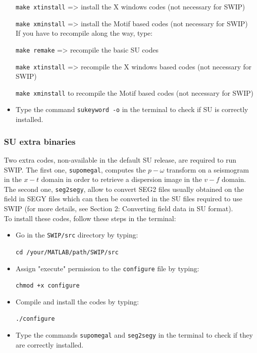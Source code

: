 \documentclass[twoside,a4paper]{article}
\begin{document}
\begin{itemize}
\verb|make xtinstall| => install the X windows codes (not necessary for SWIP)

\verb|make xminstall| => install the Motif based codes (not necessary for SWIP)\\[1ex]
If you have to recompile along the way, type:

\verb|make remake| => recompile the basic SU codes

\verb|make xtinstall| => recompile the X windows based codes (not necessary for SWIP)

\verb|make xminstall| to recompile the Motif based codes (not necessary for SWIP)

\item Type the command \verb|sukeyword -o| in the terminal to check if SU is correctly installed.
\end{itemize}

\subsubsection{SU extra binaries}
Two extra codes, non-available in the default SU release, are required to run SWIP. The first one, \verb|supomegal|, computes the $p-\omega$ transform on a seismogram in the $x-t$ domain in order to retrieve a dispersion image in the $v-f$ domain. The second one, \verb|seg2segy|, allow to convert SEG2 files usually obtained on the field in SEGY files which can then be converted in the SU files required to use SWIP (for more details, see Section 2: Converting field data in SU format).\\[1ex]
To install these codes, follow these steps in the terminal:
\begin{itemize}
\setlength\itemsep{2ex}
\setlength{\parindent}{5ex}
\item Go in the \verb|SWIP/src| directory by typing:

\verb|cd /your/MATLAB/path/SWIP/src|

\item Assign "execute" permission to the \verb|configure| file by typing:

\verb|chmod +x configure|

\item Compile and install the codes by typing:

\verb|./configure|

\item Type the commands \verb|supomegal| and \verb|seg2segy| in the terminal to check if they are correctly installed.

\end{itemize}
\end{document}
